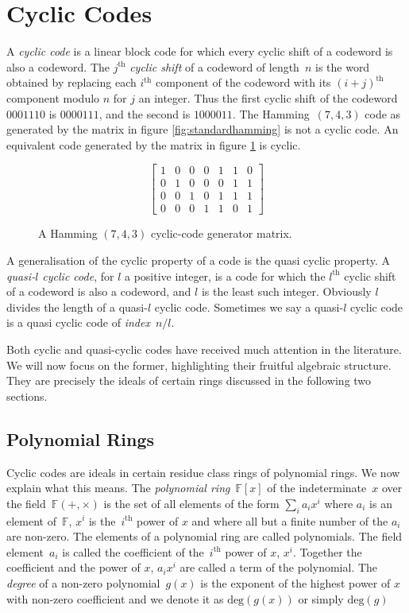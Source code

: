 \section{Cyclic Codes}
\label{sect:cycliccodes}
A \emph{cyclic code} is a linear block code for which every cyclic shift of a codeword is also a codeword.
The $j^{\textrm{th}}$ \emph{cyclic shift} of a codeword of length~$n$ is the word obtained by replacing each $i^{\textrm{th}}$ component of the codeword with its $(i+j)^{\textrm{th}}$ component modulo $n$ for $j$ an integer.
Thus the first cyclic shift of the codeword~$0001110$ is $0000111$, and the second is $1000011$.
The Hamming~$(7,4,3)$ code as generated by the matrix in figure \ref{fig:standardhamming} is not a cyclic code.
An equivalent code generated by the matrix in figure \ref{fig:equivhamming} is cyclic.
\begin{figure}[htbp]
\begin{center}
\[ \left[ \begin{array}{ccccccc}
1 & 0 & 0 & 0 & 1 & 1 & 0 \\
0 & 1 & 0 & 0 & 0 & 1 & 1 \\
0 & 0 & 1 & 0 & 1 & 1 & 1 \\
0 & 0 & 0 & 1 & 1 & 0 & 1
\end{array} \right] \]
\caption{A Hamming $(7,4,3)$ cyclic-code generator matrix.}
\label{fig:equivhamming}
\end{center}
\end{figure}

A generalisation of the cyclic property of a code is the quasi cyclic property.
A \emph{quasi-$l$ cyclic code}, for $l$ a positive integer, is a code for which the $l^{\textrm{th}}$ cyclic shift of a codeword is also a codeword, and $l$ is the least such integer.
Obviously $l$ divides the length of a quasi-$l$ cyclic code.
Sometimes we say a quasi-$l$ cyclic code is a quasi cyclic code of \emph{index}~$n/l$.

Both cyclic and quasi-cyclic codes have received much attention in the literature.
We will now focus on the former, highlighting their fruitful algebraic structure.
They are precisely the ideals of certain rings discussed in the following two sections.

\subsection{Polynomial Rings}
Cyclic codes are ideals in certain residue class rings of polynomial rings.
We now explain what this means.
The \emph{polynomial ring}~$\mathbb{F}[x]$ of the indeterminate~$x$ over the field~$\mathbb{F}(+,\times)$ is the set of all elements of the form $\sum_i a_i x^i$ where $a_i$ is an element of~$\mathbb{F}$, $x^i$ is the~$i^{\textrm{th}}$ power of $x$ and where all but a finite number of the $a_i$ are non-zero.
The elements of a polynomial ring are called polynomials.
The field element~$a_i$ is called the coefficient of the~$i^{\textrm{th}}$ power of $x$, $x^i$.
Together the coefficient and the power of $x$, $a_i x^i$ are called a term of the polynomial.
The \emph{degree} of a non-zero polynomial~$g(x)$ is the exponent of the highest power of $x$ with non-zero coefficient and we denote it as $\textrm{deg}(g(x))$ or simply $\textrm{deg}(g)$

